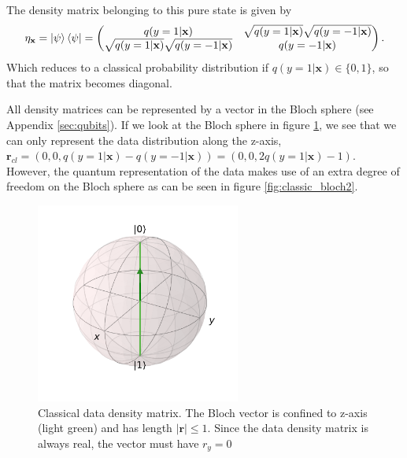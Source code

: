 The density matrix belonging to this pure state is given by
\begin{equation*}
\eta_\mathbf{x} = \ket{\psi}\bra{\psi}=
    \begin{pmatrix}
    q(y=1|\mathbf{x}) & \sqrt{q(y=1|\mathbf{x})}\sqrt{q(y=-1|\mathbf{x})} \\
    \sqrt{q(y=1|\mathbf{x})}\sqrt{q(y=-1|\mathbf{x})} & q(y=-1|\mathbf{x})
    \end{pmatrix}.
\end{equation*}
Which reduces to a classical probability distribution if $q(y=1|\mathbf{x}) \in \{0,1\}$, so that the matrix becomes diagonal.\newline

\noindent All density matrices can be represented by a vector in the Bloch sphere (see Appendix \ref{sec:qubits}). If we look at the Bloch sphere in figure \ref{fig:classic_bloch}, we see that we can only represent the data distribution along the z-axis, $\mathbf{r}_{cl} = (0,0,q(y=1|\mathbf{x})-q(y=-1|\mathbf{x})) = (0,0,2q(y=1|\mathbf{x})-1)$.
However, the quantum representation of the data makes use of an extra degree of freedom on the Bloch sphere as can be seen in figure \ref{fig:classic_bloch2}. 
\begin{figure}[ht!]
    \centering
    \includegraphics[width=0.6\textwidth]{figures/chapter3/bloch_sphere_2a.pdf}
    \caption{Classical data density matrix. The Bloch vector is confined to z-axis (light green) and has length $|\mathbf{r}|\leq1$. Since the data density matrix is always real, the vector must have $r_y=0$}
    \label{fig:classic_bloch}
\end{figure}

